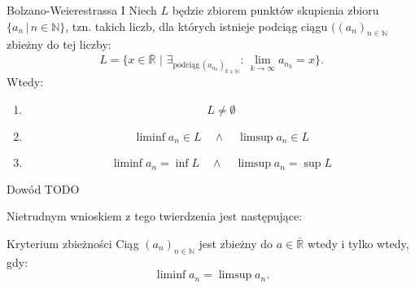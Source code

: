 \documentclass{article}
\numberwithin{defi}{section}
\numberwithin{theo}{section}
\numberwithin{defi}{section}
\newcommand{\R}{\mathbb{R}}
\newcommand{\Rbar}{\overline{\mathbb{R}}}
\newcommand{\N}{\mathbb{N}}
\newcommand{\ciag}[1]{(#1_{n})_{n \in \N}}
\begin{document}
\begin{twier}{Bolzano-Weierestrassa I} \label{twier:BL I}
    Niech $L$ będzie zbiorem punktów skupienia zbioru $\{a_n \, | \, n \in \N\}$, tzn. takich liczb, dla których istnieje podciąg ciągu $(\ciag{a}$ zbieżny do tej liczby: \begin{equation}
        L = \{ x \in \overline{\R} \,\, | \,\, \exists_{\text{podciąg} \, (a_{n_k})_{k \in \N}} : \, \lim_{k \to \infty} a_{n_k} = x \}.
    \end{equation}
    Wtedy:
    \begin{enumerate}
        \item \begin{equation}
                  L \neq \emptyset
              \end{equation}
        \item \begin{equation}
                  \liminf{a_n} \in L  \quad \land \quad \limsup{a_n} \in L
              \end{equation}
        \item \begin{equation}
                  \liminf{a_n} = \inf{L} \quad \land \quad \limsup{a_n} = \sup{L}
              \end{equation}
    \end{enumerate}
\end{twier}

\begin{dow}{Dowód}
    TODO
\end{dow}

Nietrudnym wnioskiem z tego twierdzenia jest następujące:
\begin{twier}{Kryterium zbieżności}
    Ciąg $\ciag{a}$ jest zbieżny do $a \in \Rbar$ wtedy i tylko wtedy, gdy: \begin{equation}
        \liminf a_n = \limsup a_n.
    \end{equation}
\end{twier}
\end{document}
